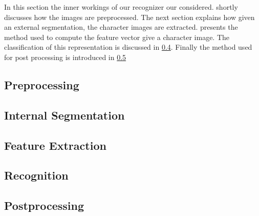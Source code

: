In this section the inner workings of our recognizer our considered.  shortly discusses how the images are preprocessed. The next section explains how given an external segmentation, the character images are extracted.  presents the method used to compute the feature vector give a character image. The classification of this representation is discussed in \cref{ss:methods:recognition}. Finally the method used for post processing is introduced in \cref{ss:methods:postprocessing}

\subsection{Preprocessing}
\label{ss:methods:preprocessing}


\subsection{Internal Segmentation}
\label{ss:methods:characterSegmentation}


\subsection{Feature Extraction}
\label{ss:methods:featureExtraction}


\subsection{Recognition}
\label{ss:methods:recognition}


\subsection{Postprocessing}
\label{ss:methods:postprocessing}


